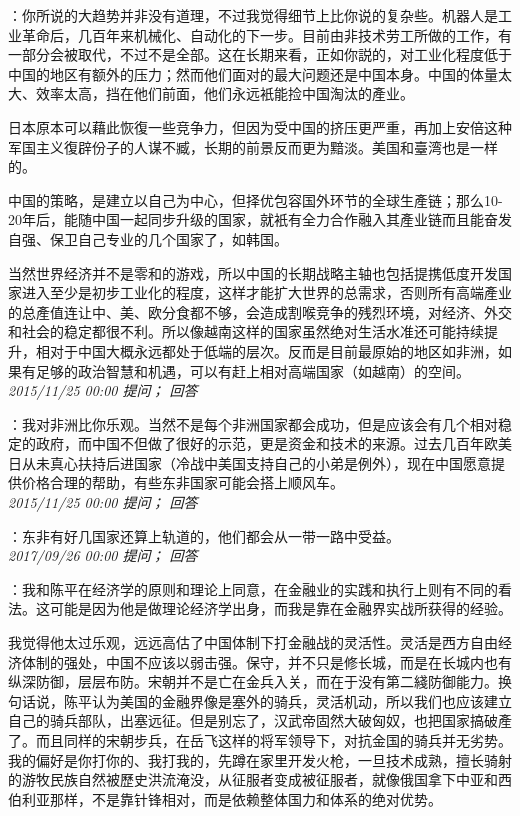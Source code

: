 \documentclass[twocolumn]{ctexart}
\begin{document}
：你所说的大趋势并非没有道理，不过我觉得细节上比你说的复杂些。机器人是工业革命后，几百年来机械化、自动化的下一步。目前由非技术劳工所做的工作，有一部分会被取代，不过不是全部。这在长期来看，正如你説的，对工业化程度低于中国的地区有额外的压力；然而他们面对的最大问题还是中国本身。中国的体量太大、效率太高，挡在他们前面，他们永远衹能捡中国淘汰的產业。

日本原本可以藉此恢復一些竞争力，但因为受中国的挤压更严重，再加上安倍这种军国主义復辟份子的人谋不臧，长期的前景反而更为黯淡。美国和臺湾也是一样的。

中国的策略，是建立以自己为中心，但择优包容国外环节的全球生產链；那么10-20年后，能随中国一起同步升级的国家，就衹有全力合作融入其產业链而且能奋发自强、保卫自己专业的几个国家了，如韩国。

当然世界经济并不是零和的游戏，所以中国的长期战略主轴也包括提携低度开发国家进入至少是初步工业化的程度，这样才能扩大世界的总需求，否则所有高端產业的总產值连让中、美、欧分食都不够，会造成割喉竞争的残烈环境，对经济、外交和社会的稳定都很不利。所以像越南这样的国家虽然绝对生活水准还可能持续提升，相对于中国大概永远都处于低端的层次。反而是目前最原始的地区如非洲，如果有足够的政治智慧和机遇，可以有赶上相对高端国家（如越南）的空间。\\

\textit{\hfill\noindent\small 2015/11/25 00:00 提问； 回答}

：我对非洲比你乐观。当然不是每个非洲国家都会成功，但是应该会有几个相对稳定的政府，而中国不但做了很好的示范，更是资金和技术的来源。过去几百年欧美日从未真心扶持后进国家（冷战中美国支持自己的小弟是例外），现在中国愿意提供价格合理的帮助，有些东非国家可能会搭上顺风车。\\

\textit{\hfill\noindent\small 2015/11/25 00:00 提问； 回答}

：东非有好几国家还算上轨道的，他们都会从一带一路中受益。\\

\textit{\hfill\noindent\small 2017/09/26 00:00 提问； 回答}

：我和陈平在经济学的原则和理论上同意，在金融业的实践和执行上则有不同的看法。这可能是因为他是做理论经济学出身，而我是靠在金融界实战所获得的经验。

我觉得他太过乐观，远远高估了中国体制下打金融战的灵活性。灵活是西方自由经济体制的强处，中国不应该以弱击强。保守，并不只是修长城，而是在长城内也有纵深防御，层层布防。宋朝并不是亡在金兵入关，而在于没有第二綫防御能力。换句话说，陈平认为美国的金融界像是塞外的骑兵，灵活机动，所以我们也应该建立自己的骑兵部队，出塞远征。但是别忘了，汉武帝固然大破匈奴，也把国家搞破產了。而且同样的宋朝步兵，在岳飞这样的将军领导下，对抗金国的骑兵并无劣势。我的偏好是你打你的、我打我的，先蹲在家里开发火枪，一旦技术成熟，擅长骑射的游牧民族自然被歷史洪流淹没，从征服者变成被征服者，就像俄国拿下中亚和西伯利亚那样，不是靠针锋相对，而是依赖整体国力和体系的绝对优势。
\end{document}
